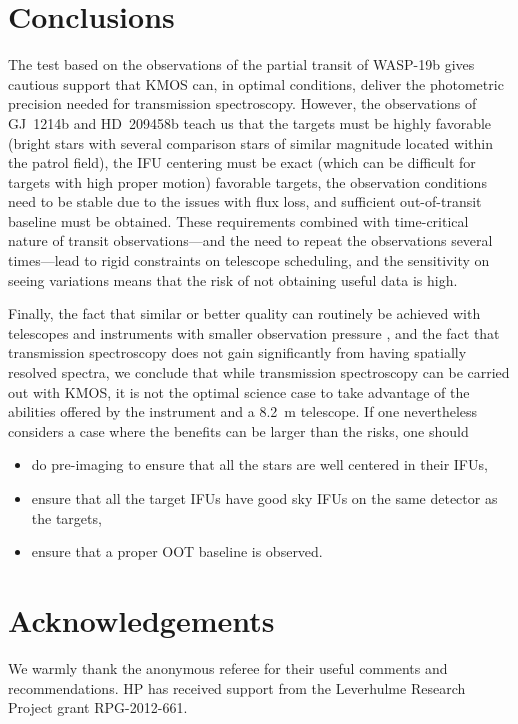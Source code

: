 \documentclass[useAMS,usenatbib]{mn2e}
\begin{document}
\section{Conclusions}

The test based on the observations of the partial transit of WASP-19b gives cautious support that KMOS can, in optimal
conditions, deliver the photometric precision needed for transmission spectroscopy. However, the observations of
GJ~1214b and HD~209458b teach us that the targets must be highly favorable (bright stars with several comparison stars
of similar magnitude located within the patrol field), the IFU centering must be exact (which can be difficult for
targets with high proper motion) favorable targets, the observation conditions need to be stable due to the issues with
flux loss, and sufficient out-of-transit baseline must be obtained. These requirements combined with time-critical
nature of transit observations---and the need to repeat the observations several times---lead to rigid constraints on
telescope scheduling, and the sensitivity on seeing variations means that the risk of not obtaining useful data is
high. 

Finally, the fact that similar or better quality can routinely be achieved with telescopes and instruments with smaller
observation pressure \citep{Bean2013,Bean2010a,Bean2011,Croll2011,Crossfield2011}, and the fact that transmission
spectroscopy does not gain significantly from having spatially resolved spectra, we conclude that while transmission
spectroscopy can be carried out with KMOS, it is not the optimal science case to take advantage of the abilities offered
by the instrument and a 8.2~m telescope. If one nevertheless considers a case where the benefits can be larger than the
risks, one should 
\begin{itemize}
  \item do pre-imaging to ensure that all the stars are well centered in their IFUs,
  \item ensure that all the target IFUs have good sky IFUs on the same detector as the targets,
  \item ensure that a proper OOT baseline is observed.
\end{itemize}

\section*{Acknowledgements}
We warmly thank the anonymous referee for their useful comments and recommendations.
HP has received support from the Leverhulme Research Project grant RPG-2012-661.



\end{document}
